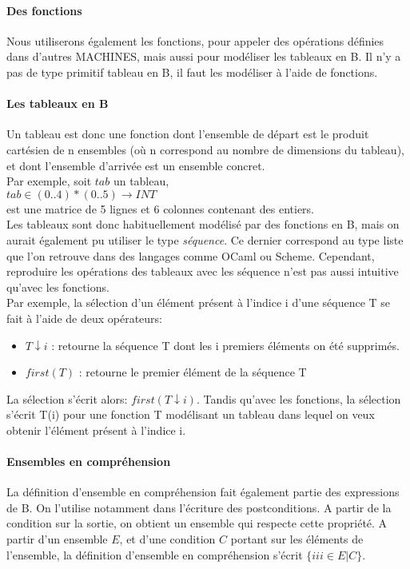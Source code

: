 \paragraph{Des fonctions}

Nous utiliserons également les fonctions, pour appeler des opérations
définies dans d'autres MACHINES, mais aussi pour modéliser les
tableaux en B. Il n'y a pas de type primitif tableau en B, il faut les
modéliser à l'aide de fonctions. 

\paragraph{Les tableaux en B}
Un tableau est donc une fonction dont l'ensemble de départ est le produit
cartésien de n ensembles (où n correspond au nombre de dimensions du
tableau), et dont l'ensemble d'arrivée est un ensemble concret.\\
Par exemple, soit $tab$ un tableau, \\
$tab \in (0..4)*(0..5) \rightarrow INT$ \\
est une matrice de 5 lignes et 6 colonnes contenant des entiers.\\

Les tableaux sont donc habituellement modélisé par des fonctions en B,
mais on aurait également pu utiliser le type \emph{séquence}. Ce
dernier correspond au type liste que l'on retrouve dans des langages
comme OCaml ou Scheme. Cependant, reproduire les opérations des
tableaux avec les séquence n'est pas aussi intuitive qu'avec les
fonctions.\\

Par exemple, la sélection d'un élément présent à l'indice i d'une
séquence T se fait à l'aide de deux opérateurs:
\begin{itemize}
\item $T\downarrow i$ : retourne la séquence T dont les i premiers
éléments on été supprimés.
\item $first(T)$ : retourne le premier élément de la séquence T
\end{itemize}
La sélection s'écrit alors: $first(T\downarrow i)$. Tandis qu'avec les
fonctions, la sélection s'écrit T(i) pour une fonction T modélisant un
tableau dans lequel on veux obtenir l'élément présent à l'indice i.

\paragraph{Ensembles en compréhension}
La définition d'ensemble en compréhension fait également partie des expressions de
B. On l'utilise notamment dans l'écriture des postconditions. A partir
de la condition sur la sortie, on obtient un ensemble qui respecte
cette propriété. A partir d'un ensemble $E$, et d'une
condition $C$ portant sur les éléments de l'ensemble, la définition
d'ensemble en compréhension s'écrit $\{ iii \in E | C \}$.


